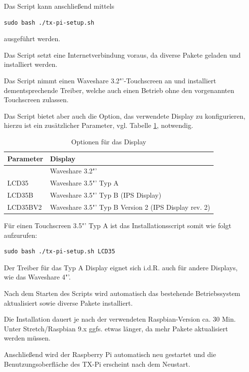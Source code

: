 \documentclass[
  paper=A4,
  ngerman,
  fontsize=12pt,
  parskip=half-,
]{scrbook}
\begin{document}
Das Script kann anschließend mittels
\begin{lstlisting}
sudo bash ./tx-pi-setup.sh
\end{lstlisting}
ausgeführt werden.

Das Script setzt eine Internetverbindung voraus, da diverse Pakete geladen und
installiert werden.

Das Script nimmt einen Waveshare 3.2"'-Touchscreen an und installiert
dementsprechende Treiber, welche auch einen Betrieb ohne den vorgenannten
Touchscreen zulassen.

Das Script bietet aber auch die Option, das verwendete Display zu 
konfigurieren, hierzu ist ein zusätzlicher Parameter, vgl. Tabelle \ref{tab:display_opt},
notwendig.

\begin{table}[ht]
\begin{tabular}{ll}
Parameter & Display \\
\midrule
          & Waveshare 3.2"' \\
LCD35     & Waveshare 3.5"' Typ A \\
LCD35B    & Waveshare 3.5"' Typ B (IPS Display)\\
LCD35BV2  & Waveshare 3.5"' Typ B Version 2 (IPS Display rev. 2)\\
\end{tabular}
\caption{Optionen für das Display}
\label{tab:display_opt}
\end{table}

Für einen Touchscreen 3.5"' Typ A ist das Installationsscript somit wie folgt aufzurufen:
\begin{lstlisting}
sudo bash ./tx-pi-setup.sh LCD35
\end{lstlisting}

Der Treiber für das Typ A Display eignet sich i.d.R. auch für andere
Displays, wie das Waveshare 4"'.


Nach dem Starten des Scripts wird automatisch das bestehende Betriebssystem aktualisiert
sowie diverse Pakete installiert. 

Die Installation dauert je nach der verwendeten Raspbian-Version ca. 30 Min. Unter Stretch/Raspbian 9.x
ggfs. etwas länger, da mehr Pakete aktualisiert werden müssen.

Anschließend wird der Raspberry Pi automatisch neu gestartet und die Benutzungsoberfläche des TX-Pi erscheint nach dem Neustart.
\end{document}

